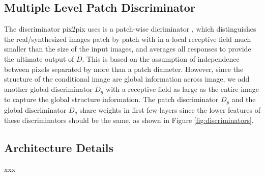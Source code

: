 \subsection{Multiple Level Patch Discriminator}
The discriminator pix2pix uses is a patch-wise dicriminator \cite{PatchGANs}, which distinguishes the real/synthesized images patch by patch with in a local receptive field much smaller than the size of the input images, and averages all responses to provide the ultimate output of $D$. This is based on the assumption of independence between pixels separated by more than a patch diameter. However, since the structure of the conditional image are global information across image, we add another global discriminator $D_g$ with a receptive field as large as the entire image to capture the global structure information. The patch discriminator $D_p$ and the global discriminator $D_g$ share weights in first few layers since the lower features of these discriminators should be the same, as shown in Figure \ref{fig:discriminators}.
%
%
\subsection{Architecture Details}
xxx
